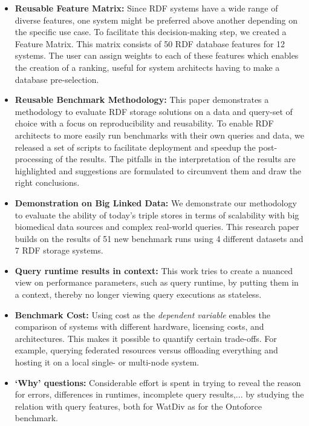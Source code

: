 \begin{itemize}
	\item \textbf{Reusable Feature Matrix:} Since RDF systems have a wide range of diverse features, one system might be preferred above another depending on the specific use case. To facilitate this decision-making step, we created a Feature Matrix. This matrix consists of 50 RDF database features for 12 systems.  The user can assign weights to each of these features which enables the creation of a ranking, useful for system architects having to make a database pre-selection.
	\item \textbf{Reusable Benchmark Methodology:} This paper demonstrates a methodology to evaluate RDF storage solutions on a data and query-set of choice with a focus on reproducibility and reusability. To enable RDF architects to more easily run benchmarks with their own queries and data, we released a set of scripts to facilitate deployment and speedup the post-processing of the results. The pitfalls in the interpretation of the results  are highlighted and suggestions are formulated to circumvent them and draw the right conclusions. 
	\item \textbf{Demonstration on Big Linked Data:} We demonstrate our methodology to evaluate the ability of today's triple stores in terms of scalability with big biomedical data sources and complex real-world queries. This research paper builds on the results of 51 new benchmark runs using 4 different datasets and 7 RDF storage systems. 
	\item \textbf{Query runtime results in context:} This work tries to create a nuanced view on performance parameters, such as query runtime, by putting them in a context, thereby no longer viewing query executions as stateless. 
	\item \textbf{Benchmark Cost:} Using cost as the \emph{dependent variable} enables the comparison of systems with different hardware, licensing costs, and architectures. This makes it possible to quantify certain trade-offs. For example, querying federated resources versus offloading everything and hosting it on a local single- or multi-node system.
	\item \textbf{`Why' questions:} Considerable effort is spent in trying to reveal the reason for errors, differences in runtimes, incomplete query results,... by studying the relation with query features, both for WatDiv as for the Ontoforce benchmark.

\end{itemize}
